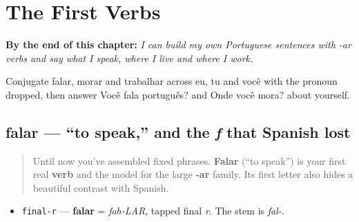 
\chapter{The First Verbs}
\label{ch:pt-first-verbs}

\begin{chapteropening}
\textbf{By the end of this chapter:} \emph{I can build my own Portuguese sentences with -ar verbs and say what I speak, where I live and where I work.}

Conjugate falar, morar and trabalhar across eu, tu and você with the pronoun dropped, then answer Você fala português? and Onde você mora? about yourself.
\end{chapteropening}

\section[falar]{falar — \textquotedblleft{}to speak,\textquotedblright{} and the \emph{f} that Spanish lost}

\label{lesson:PT-C05-falar}



\begin{quote}
Until now you've assembled fixed phrases. \textbf{Falar} (“to speak”) is your first real \textbf{verb} and the model for the large \textbf{-ar} family. Its first letter also hides a beautiful contrast with Spanish.
\end{quote}

\begin{sounds}
\begin{itemize}
\raggedright
  \item \texttt{final-r} — \textbf{falar} = \emph{fah-LAR}, tapped final \emph{r}. The stem is \emph{fal-}.
\end{itemize}
\end{sounds}

